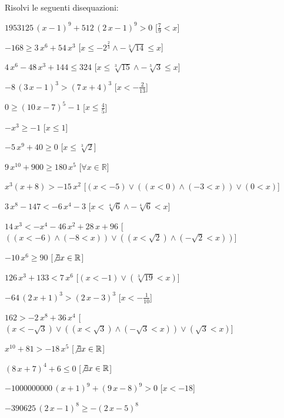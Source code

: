 \begin{esercizio}\label{ese:03.1}
Risolvi le seguenti disequazioni:
\begin{enumeratea}
\item $1953125\, \left( x-1 \right) ^{9}+512\, \left( 2\,x-1 \right) ^{9}>0$ 
\hfill [${\frac {7}{9}}<x$]
\item $-168\geq 3\,{x}^{6}+54\,{x}^{3}$ 
\hfill [$x\leq -{2}^{{\frac {2}{3}}} \wedge -\sqrt [3]{14}\leq x$]
\item $4\,{x}^{6}-48\,{x}^{3}+144\leq 324$ 
\hfill [$x\leq \sqrt [3]{15} \wedge -\sqrt [3]{3}\leq x$]
\item $-8\, \left( 3\,x-1 \right) ^{3}> \left( 7\,x+4 \right) ^{3}$ 
\hfill [$x<-{\frac {2}{13}}$]
\item $0\geq  \left( 10\,x-7 \right) ^{5}-1$ 
\hfill [$x\leq {\frac {4}{5}}$]
\item $-{x}^{3}\geq -1$ 
\hfill [$x\leq 1$]
\item $-5\,{x}^{9}+40\geq 0$ 
\hfill [$x\leq \sqrt [3]{2}$]
\item $9\,{x}^{10}+900\geq 180\,{x}^{5}$ 
\hfill [$\forall x \in \mathbb{R}$]
\item ${x}^{3} \left( x+8 \right) >-15\,{x}^{2}$ 
\hfill [$(x<-5)\vee ((x<0) \wedge (-3<x))\vee (0<x)$]
\item $3\,{x}^{8}-147<-6\,{x}^{4}-3$ 
\hfill [$x<\sqrt [4]{6} \wedge -\sqrt [4]{6}<x$]
\item $14\,{x}^{3}<-{x}^{4}-46\,{x}^{2}+28\,x+96$ 
\hfill [$((x<-6) \wedge (-8<x))\vee ((x<\sqrt {2}) \wedge (-\sqrt {2}<x))$]
\item $-10\,{x}^{6}\geq 90$ 
\hfill [$\not\exists x \in \mathbb{R}$]
\item $126\,{x}^{3}+133<7\,{x}^{6}$ 
\hfill [$(x<-1)\vee (\sqrt [3]{19}<x)$]
\item $-64\, \left( 2\,x+1 \right) ^{3}> \left( 2\,x-3 \right) ^{3}$ 
\hfill [$x<-{\frac {1}{10}}$]
\item $162>-2\,{x}^{8}+36\,{x}^{4}$ 
\hfill [$(x<-\sqrt {3})\vee ((x<\sqrt {3}) \wedge (-\sqrt {3}<x))\vee (\sqrt 
{3}<x)$]
\item ${x}^{10}+81>-18\,{x}^{5}$ 
\hfill [$\not\exists x \in \mathbb{R}$]
\item $ \left( 8\,x+7 \right) ^{4}+6\leq 0$ 
\hfill [$\not\exists x \in \mathbb{R}$]
\item $-1000000000\, \left( x+1 \right) ^{9}+ \left( 9\,x-8 \right) ^{9}>0$ 
\hfill [$x<-18$]
\item $-390625\, \left( 2\,x-1 \right) ^{8}\geq - \left( 2\,x-5 \right) ^{8}$ 

\end{enumeratea}
\end{esercizio}
